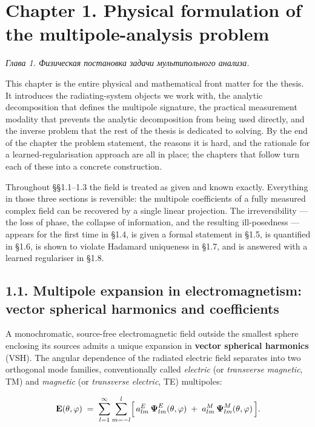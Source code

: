 \documentclass[
  english,
  11pt,
]{report}
\author{}
\date{}
\begin{document}
\chapter{Chapter 1. Physical formulation of the multipole-analysis
problem}\label{chapter-1.-physical-formulation-of-the-multipole-analysis-problem}

\emph{Глава 1. Физическая постановка задачи мультипольного анализа.}

This chapter is the entire physical and mathematical front matter for
the thesis. It introduces the radiating-system objects we work with, the
analytic decomposition that defines the multipole signature, the
practical measurement modality that prevents the analytic decomposition
from being used directly, and the inverse problem that the rest of the
thesis is dedicated to solving. By the end of the chapter the problem
statement, the reasons it is hard, and the rationale for a
learned-regularisation approach are all in place; the chapters that
follow turn each of these into a concrete construction.

Throughout §§1.1--1.3 the field is treated as given and known exactly.
Everything in those three sections is reversible: the multipole
coefficients of a fully measured complex field can be recovered by a
single linear projection. The irreversibility --- the loss of phase, the
collapse of information, and the resulting ill-posedness --- appears for
the first time in §1.4, is given a formal statement in §1.5, is
quantified in §1.6, is shown to violate Hadamard uniqueness in §1.7, and
is answered with a learned regulariser in §1.8.

\section{1.1. Multipole expansion in electromagnetism: vector spherical
harmonics and
coefficients}\label{multipole-expansion-in-electromagnetism-vector-spherical-harmonics-and-coefficients}

A monochromatic, source-free electromagnetic field outside the smallest
sphere enclosing its sources admits a unique expansion in \textbf{vector
spherical harmonics} (VSH). The angular dependence of the radiated
electric field separates into two orthogonal mode families,
conventionally called \emph{electric} (or \emph{transverse magnetic},
TM) and \emph{magnetic} (or \emph{transverse electric}, TE) multipoles:

\[
\mathbf{E}(\theta,\varphi) \;=\; \sum_{l=1}^{\infty}\sum_{m=-l}^{l}
\Bigl[\, a^E_{lm}\,\boldsymbol{\Psi}^E_{lm}(\theta,\varphi) \;+\; a^M_{lm}\,\boldsymbol{\Psi}^M_{lm}(\theta,\varphi)\,\Bigr].
\]
\end{document}
